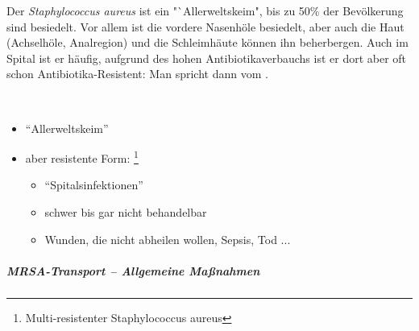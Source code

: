 \gMarried
{Der \emph{Staphylococcus aureus} ist ein
"`Allerweltskeim", bis zu 50\% der
Bev\"olkerung sind besiedelt. Vor allem ist die vordere
Nasenh\"ole besiedelt, aber auch die Haut (Achselh\"ole,
Analregion) und die Schleimhäute können ihn beherbergen.
Auch im Spital ist er häufig, aufgrund des hohen
Antibiotikaverbauchs ist er dort aber oft schon
Antibiotika-Resistent: Man spricht dann vom .}
{~

\begin{itemize}
    \item "`Allerweltskeim"'
    \item aber resistente Form:
    \footnote{Multi-resistenter Staphylococcus aureus}
    \begin{itemize}
        \item {\textquotedblleft}Spitalsinfektionen{\textquotedblright}
        \item schwer bis gar nicht behandelbar
        \item Wunden, die nicht abheilen wollen, Sepsis, Tod ...
    \end{itemize}
\end{itemize}
}






\subparagraph{MRSA-Transport -- Allgemeine Ma{\ss}nahmen}
\label{bkm:RefHeading40262819}

